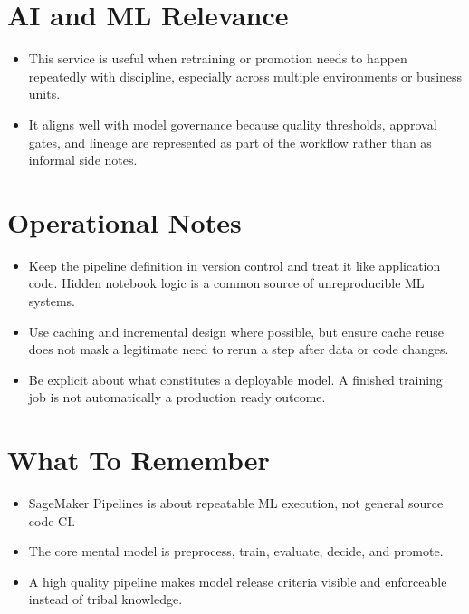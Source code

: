\documentclass[10pt,twocolumn]{article}
\begin{document}
\section*{AI and ML Relevance}
\begin{itemize}
\item This service is useful when retraining or promotion needs to happen repeatedly with discipline, especially across multiple environments or business units.
\item It aligns well with model governance because quality thresholds, approval gates, and lineage are represented as part of the workflow rather than as informal side notes.
\end{itemize}

\section*{Operational Notes}
\begin{itemize}
\item Keep the pipeline definition in version control and treat it like application code. Hidden notebook logic is a common source of unreproducible ML systems.
\item Use caching and incremental design where possible, but ensure cache reuse does not mask a legitimate need to rerun a step after data or code changes.
\item Be explicit about what constitutes a deployable model. A finished training job is not automatically a production ready outcome.
\end{itemize}

\section*{What To Remember}
\begin{itemize}
\item SageMaker Pipelines is about repeatable ML execution, not general source code CI.
\item The core mental model is preprocess, train, evaluate, decide, and promote.
\item A high quality pipeline makes model release criteria visible and enforceable instead of tribal knowledge.
\end{itemize}
\end{document}
